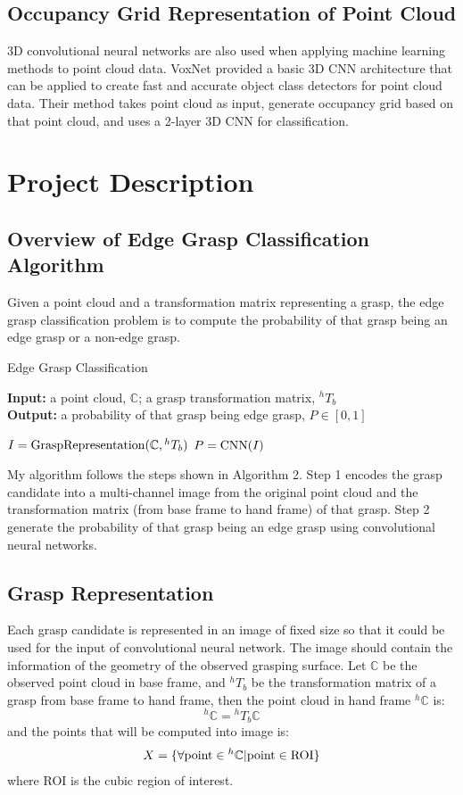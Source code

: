 \documentclass[letterpaper]{article} %
\begin{document}
\subsection{Occupancy Grid Representation of Point Cloud}
3D convolutional neural networks are also used when applying machine learning methods to point cloud data. VoxNet \cite{RN4} provided a basic 3D CNN architecture that can be applied to create fast and accurate object class detectors for point cloud data. Their method takes point cloud as input, generate occupancy grid based on that point cloud, and uses a 2-layer 3D CNN for classification.

\section{Project Description}
\subsection{Overview of Edge Grasp Classification Algorithm}
Given a point cloud and a transformation matrix representing a grasp, the edge grasp classification problem is to compute the probability of that grasp being an edge grasp or a non-edge grasp.

\begin{algorithm}[H]
\caption{Edge Grasp Classification}
\textbf{Input:} a point cloud, $\mathbb{C}$; a grasp transformation matrix, ${^h}T_b$ \\
\textbf{Output:} a probability of that grasp being edge grasp, $P\in [0, 1]$ \\
\begin{algorithmic}[1]
\STATE $I={\rm GraspRepresentation}(\mathbb{C}, {^h}T_b)$
\STATE $P={\rm CNN}(I)$
\end{algorithmic}
\end{algorithm}

My algorithm follows the steps shown in Algorithm 2. Step 1 encodes the grasp candidate into a multi-channel image from the original point cloud and the transformation matrix (from base frame to hand frame) of that grasp. Step 2 generate the probability of that grasp being an edge grasp using convolutional neural networks.

\subsection{Grasp Representation}
Each grasp candidate is represented in an image of fixed size so that it could be used for the input of convolutional neural network. The image should contain the information of the geometry of the observed grasping surface. Let $\mathbb{C}$ be the observed point cloud in base frame, and ${}^hT_b$ be the transformation matrix of a grasp from base frame to hand frame, then the point cloud in hand frame ${}^h\mathbb{C}$ is:
\begin{equation}
    {}^h\mathbb{C}={}^hT_b\mathbb{C}
\end{equation}
and the points that will be computed into image is:
\begin{equation}
    X=\{\forall {\rm point}\in {}^h\mathbb{C}|{\rm point}\in {\rm ROI}\}
\end{equation}
where ROI is the cubic region of interest.
\end{document}
